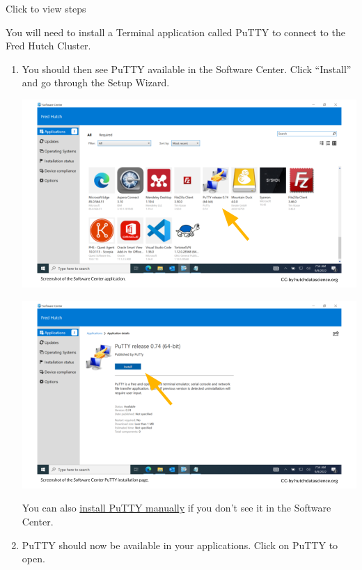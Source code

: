 \documentclass[
]{book}
\begin{document}
Click to view steps

You will need to install a Terminal application called PuTTY to connect to the Fred Hutch Cluster.

\begin{enumerate}
\def\labelenumi{\arabic{enumi}.}
\item
  You should then see PuTTY available in the Software Center. Click ``Install'' and go through the Setup Wizard.

  \includegraphics[width=1\linewidth]{resources/images/03-terminal_files/figure-latex//1BQxrVYdKZTbpCaF-i_q9w7s9x034lEXpQZDU-Sl09cs_g15643d101eb_4_15}

  \includegraphics[width=1\linewidth]{resources/images/03-terminal_files/figure-latex//1BQxrVYdKZTbpCaF-i_q9w7s9x034lEXpQZDU-Sl09cs_g15643d101eb_4_20}

  You can also \href{faq.html\#manual-putty}{install PuTTY manually} if you don't see it in the Software Center.
\item
  PuTTY should now be available in your applications. Click on PuTTY to open.


\end{enumerate}
\end{document}
